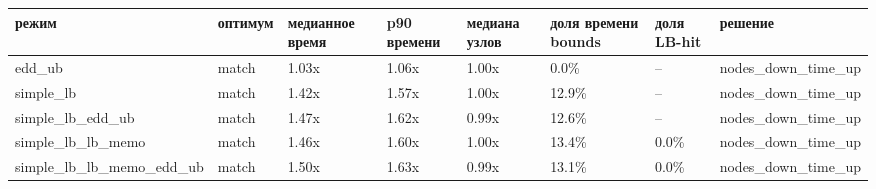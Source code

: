 \begin{tabular}{llllllll}
\toprule
режим & оптимум & медианное время & p90 времени & медиана узлов & доля времени bounds & доля LB-hit & решение \\
\midrule
edd\_ub & match & 1.03x & 1.06x & 1.00x & 0.0\% & -- & nodes\_down\_time\_up \\
simple\_lb & match & 1.42x & 1.57x & 1.00x & 12.9\% & -- & nodes\_down\_time\_up \\
simple\_lb\_edd\_ub & match & 1.47x & 1.62x & 0.99x & 12.6\% & -- & nodes\_down\_time\_up \\
simple\_lb\_lb\_memo & match & 1.46x & 1.60x & 1.00x & 13.4\% & 0.0\% & nodes\_down\_time\_up \\
simple\_lb\_lb\_memo\_edd\_ub & match & 1.50x & 1.63x & 0.99x & 13.1\% & 0.0\% & nodes\_down\_time\_up \\
\bottomrule
\end{tabular}
